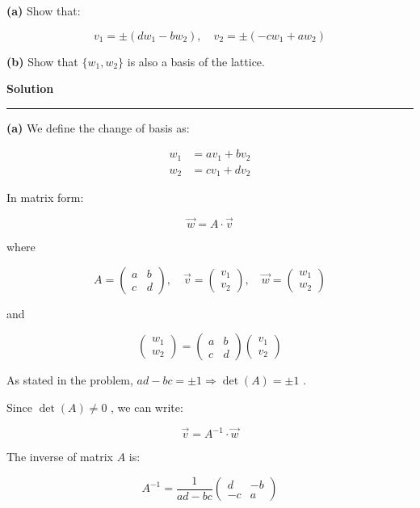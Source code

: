 \documentclass[a4paper,12pt]{article}
\begin{document}
\textbf{(a)} Show that:

\[
v_1 = \pm (d w_1 - b w_2), \quad v_2 = \pm (-c w_1 + a w_2)
\]

\textbf{(b)} Show that \(\{w_1, w_2\}\) is also a basis of the lattice.

    \textbf{Solution}

\begin{center}\rule{0.5\linewidth}{0.5pt}\end{center}

\textbf{(a)} We define the change of basis as:

\[
\begin{aligned}
w_1 &= a v_1 + b v_2 \\
w_2 &= c v_1 + d v_2
\end{aligned}
\]

In matrix form:

\[
\vec{w} = A \cdot \vec{v}
\]

where

\[
A =
\begin{pmatrix}
a & b \\
c & d
\end{pmatrix}, \quad
\vec{v} =
\begin{pmatrix}
v_1 \\
v_2
\end{pmatrix}, \quad
\vec{w} =
\begin{pmatrix}
w_1 \\
w_2
\end{pmatrix}
\]

and

\[
\begin{pmatrix}
w_1 \\
w_2
\end{pmatrix}
=
\begin{pmatrix}
a & b \\
c & d
\end{pmatrix}
\begin{pmatrix}
v_1 \\
v_2
\end{pmatrix}
\]

As stated in the problem,
\(ad - bc = \pm 1 \Rightarrow \det(A) = \pm 1\) .

Since \(\det(A) \neq 0\) , we can write:

\[
\vec{v} = A^{-1} \cdot \vec{w}
\]

The inverse of matrix \(A\) is:

\[
A^{-1} =
\frac{1}{ad - bc}
\begin{pmatrix}
d & -b \\
-c & a
\end{pmatrix}
\]
\end{document}
